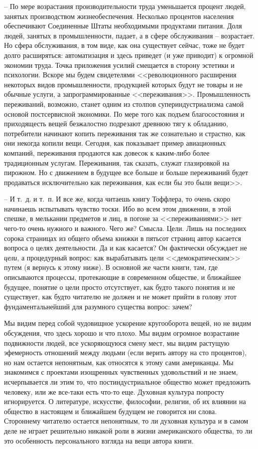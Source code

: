 \documentclass{book}
\begin{document}
-- По мере возрастания производительности труда уменьша­ется процент людей, занятых производством жизнеобеспечения. Несколько процентов населения обеспечивают Соединен­ные Штаты необходимыми продуктами питания. Доля людей, занятых в промышленности, падает, а в сфере обслуживания -- возрастает. Но сфера обслуживания, в том виде, как она су­ществует сейчас, тоже не будет долго расширяться: автомати­зация и здесь приведет (и уже приводит) к огромной экономии труда. Точка приложения усилий смещается в сторону эстетики и психологии. Вскоре мы будем свидетелями <<революционного расширения некоторых видов промышленности, продукцией которых будут не товары и не обычные услуги, а запрограммированные <<переживания>>. Промышленность переживаний, возможно, станет одним из столпов супериндустриализма самой основой постсервисной экономики. По мере того как подъем благосостояния и приходящесть вещей безжалостно подрезают древнюю тягу к обладанию, потребители начинают копить переживания так же сознательно и страстно, как 
они 
некогда копили вещи. Сегодня, как показывает пример авиаци­онных компаний, переживания продаются как довесок к каким-либо более традиционным услугам. Переживания, так сказать, служат глазировкой на пирожном. Но с движением в будущее все больше и больше переживаний будет продаваться исклю­чительно как переживания, как если бы это были вещи>>.%

-- И т.~д. и т.~п.
И все же, когда читаешь книгу Тоффлера, то очень скоро начинаешь испытывать чувство тоски. Ибо во всем этом движе­нии, в этой спешке, в мелькании предметов и лиц, в погоне за <<переживаниями>> нет чего-то очень нужного и важного. Чего же? Смысла. Цели.
Лишь на последних сорока страницах из общего объема книжки в пятьсот страниц автор касается вопроса о целях деятельности. Да и как касается? Он фактически обсуждает не \textit{цели}, а  процедурный вопрос: как вырабатывать цели <<демократическим>> путем (я вернусь к этому ниже). В основной же части книги, там, где описываются процессы, протекающие в совре­менном обществе, и ближайшее будущее, понятие о цели просто отсутствует, как будто такого понятия и не существует, как будто читателю не должен и не может прийти в голову этот фундаментальнейший для разумного существа вопрос: зачем?

Мы видим перед собой чудовищное ускорение кругооборо­та вещей, но не видим обсуждения, что здесь хорошо и что пло­хо. Мы видим огромное возрастание подвижности людей, все ускоряющуюся смену мест, мы видим растущую эфемерность отношений между людьми (если верить автору на сто процен­тов), но нам остается непонятным, как относятся к этому са­ми американцы. Мы знакомимся с проектами изощренных чувственных удовольствий и не знаем, исчерпывается ли этим то, что постиндустриальное общество может предложить чело­веку, или же все-таки есть что-то еще. Духовная культура по­просту игнорируется. О литературе, искусстве, философии, ре­лигии, об их влиянии на общество в настоящем и ближайшем бу­дущем не говорится ни слова. Стороннему читателю остается не­понятным, то ли духовная культура и в самом деле не играет решительно никакой роли в жизни американского общества, то ли это особенность персонального взгляда на вещи автора книги.
\end{document}
